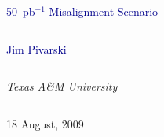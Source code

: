 \documentclass[compress]{beamer}
\begin{document}
\begin{frame}
\vfill
\begin{center}
\textcolor{darkblue}{\Large 50~pb$^{-1}$ Misalignment Scenario}

\vfill
\begin{columns}
\begin{center}
\large
\textcolor{darkblue}{Jim Pivarski}
\end{center}
\end{columns}

\begin{columns}
\begin{center}
\scriptsize
{\it Texas A\&M University}
\end{center}
\end{columns}

\vfill
18 August, 2009

\end{center}
\end{frame}


\small
\end{document}

